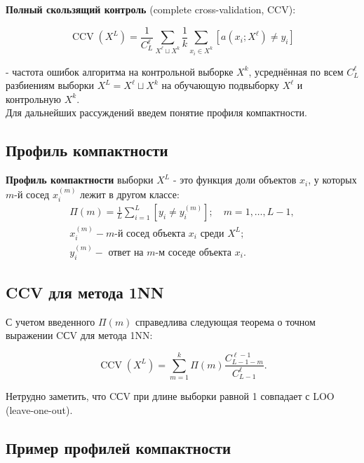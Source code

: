 \noindent
\textbf{Полный скользящий контроль}  (complete cross-validation, CCV):

\begin{equation*}
	\operatorname{CCV}\left(X^L\right)=\frac{1}{C_L^{\ell}} \sum_{X^{\ell} \sqcup X^k} \frac{1}{k} \sum_{x_i \in X^k}\left[a\left(x_i ; X^{\ell}\right) \neq y_i\right]
\end{equation*}

\noindent
- частота ошибок алгоритма на контрольной выборке $X^k$, усреднённая по всем $C_L^{\ell}$ разбиениям выборки $X^L=X^{\ell} \sqcup X^k$ на обучающую подвыборку $X^{\ell}$ и контрольную $X^k$. \\

\noindent
Для дальнейших рассуждений введем понятие профиля компактности.


\subsection{Профиль компактности}

\noindent
\textbf{Профиль компактности} выборки $X^L$ - это функция доли объектов $x_i$, у которых $m$-й сосед $x_i^{(m)}$ лежит в другом классе: $$ \begin{gathered} \Pi(m)=\frac{1}{L} \sum_{i=1}^L\left[y_i \neq y_i^{(m)}\right] ; \quad m=1, \ldots, L-1, \\ x_i^{(m)}-m \text {-й сосед объекта } x_i \text { среди } X^L ; \\ y_i^{(m)}-\text { ответ на } m \text {-м соседе объекта } x_i . \end{gathered} $$


\subsection{CCV для метода 1NN}

\noindent
С учетом введенного $\Pi(m)$ справедлива следующая теорема о точном выражении CСV для метода 1NN:

\begin{equation*}
	\operatorname{CCV}\left(X^L\right)=\sum_{m=1}^k \Pi(m) \frac{C_{L-1-m}^{\ell-1}}{C_{L-1}^{\ell}} .
\end{equation*}

\noindent
Нетрудно заметить, что CСV при длине выборки равной 1 совпадает с LOO (leave-one-out).


\subsection{Пример профилей компактности}

